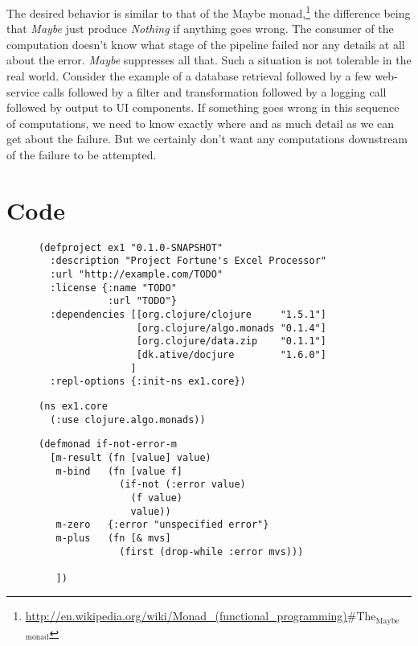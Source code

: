 \documentclass[11pt]{article}
\begin{document}
The desired behavior is similar to that of the Maybe
monad,\footnote{\url{http://en.wikipedia.org/wiki/Monad_(functional_programming)}\#The$_{\text{Maybe}}$$_{\text{monad}}$}
the difference being that \emph{Maybe} just produce \emph{Nothing} if anything
goes wrong. The consumer of the computation doesn't know what stage
of the pipeline failed nor any details at all about the error.
\emph{Maybe} suppresses all that. Such a situation is not tolerable in
the real world. Consider the example of a database retrieval
followed by a few web-service calls followed by a filter and
transformation followed by a logging call followed by output to UI
components. If something goes wrong in this sequence of
computations, we need to know exactly where and as much detail as
we can get about the failure. But we certainly don't want any
computations downstream of the failure to be attempted.

\section{Code}
\label{sec-4}

\begin{figure}[H]
\label{project-file}
\begin{verbatim}
(defproject ex1 "0.1.0-SNAPSHOT"
  :description "Project Fortune's Excel Processor"
  :url "http://example.com/TODO"
  :license {:name "TODO"
            :url "TODO"}
  :dependencies [[org.clojure/clojure     "1.5.1"]
                 [org.clojure/algo.monads "0.1.4"]
                 [org.clojure/data.zip    "0.1.1"]
                 [dk.ative/docjure        "1.6.0"]
                ]
  :repl-options {:init-ns ex1.core})
\end{verbatim}
\end{figure}

\begin{figure}[H]
\label{main-namespace}
\begin{verbatim}
(ns ex1.core
  (:use clojure.algo.monads))
\end{verbatim}
\end{figure}

\begin{figure}[H]
\label{main-monad}
\begin{verbatim}
(defmonad if-not-error-m
  [m-result (fn [value] value)
   m-bind   (fn [value f]
              (if-not (:error value)
                (f value) 
                value))
   m-zero   {:error "unspecified error"}
   m-plus   (fn [& mvs]
              (first (drop-while :error mvs)))

   ])
\end{verbatim}
\end{figure}
\end{document}
